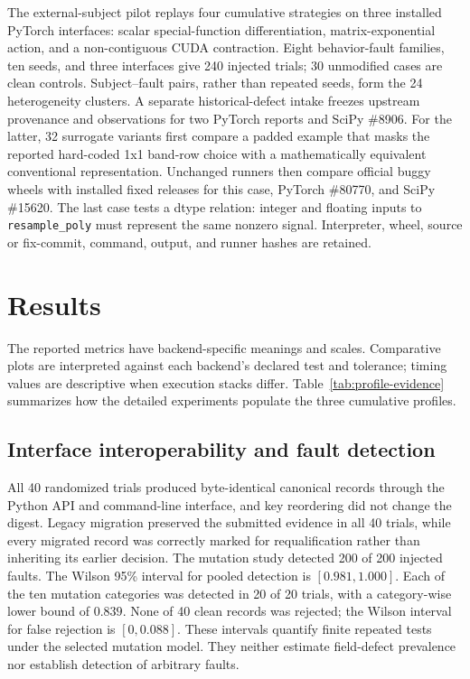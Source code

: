 \documentclass[preprint,12pt]{elsarticle}
\begin{document}
The external-subject pilot replays four cumulative strategies on three installed PyTorch interfaces: scalar special-function differentiation, matrix-exponential action, and a non-contiguous CUDA contraction. Eight behavior-fault families, ten seeds, and three interfaces give 240 injected trials; 30 unmodified cases are clean controls. Subject--fault pairs, rather than repeated seeds, form the 24 heterogeneity clusters. A separate historical-defect intake freezes upstream provenance and observations for two PyTorch reports and SciPy \#8906. For the latter, 32 surrogate variants first compare a padded example that masks the reported hard-coded 1x1 band-row choice with a mathematically equivalent conventional representation. Unchanged runners then compare official buggy wheels with installed fixed releases for this case, PyTorch \#80770, and SciPy \#15620. The last case tests a dtype relation: integer and floating inputs to \texttt{resample\_poly} must represent the same nonzero signal. Interpreter, wheel, source or fix-commit, command, output, and runner hashes are retained.

\section{Results}
The reported metrics have backend-specific meanings and scales. Comparative plots are interpreted against each backend's declared test and tolerance; timing values are descriptive when execution stacks differ. Table~\ref{tab:profile-evidence} summarizes how the detailed experiments populate the three cumulative profiles.
\subsection{Interface interoperability and fault detection}
All 40 randomized trials produced byte-identical canonical records through the Python API and command-line interface, and key reordering did not change the digest. Legacy migration preserved the submitted evidence in all 40 trials, while every migrated record was correctly marked for requalification rather than inheriting its earlier decision. The mutation study detected 200 of 200 injected faults. The Wilson 95\% interval for pooled detection is $[0.981,1.000]$. Each of the ten mutation categories was detected in 20 of 20 trials, with a category-wise lower bound of $0.839$. None of 40 clean records was rejected; the Wilson interval for false rejection is $[0,0.088]$. These intervals quantify finite repeated tests under the selected mutation model. They neither estimate field-defect prevalence nor establish detection of arbitrary faults.
\end{document}
